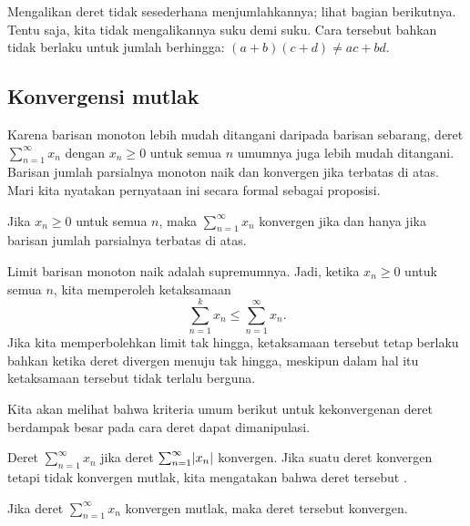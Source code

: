 Mengalikan deret tidak sesederhana menjumlahkannya; lihat bagian
berikutnya.
Tentu saja, kita tidak mengalikannya
suku demi suku.  Cara tersebut bahkan tidak berlaku untuk jumlah berhingga:
$(a+b)(c+d) \neq ac+bd$.

\subsection{Konvergensi mutlak}

Karena barisan monoton lebih mudah ditangani daripada barisan sebarang,
deret $\sum_{n=1}^\infty x_n$ dengan $x_n \geq 0$ untuk semua $n$
umumnya juga lebih mudah ditangani.  Barisan jumlah parsialnya monoton naik
dan konvergen jika terbatas di atas.
Mari kita nyatakan pernyataan ini secara formal sebagai proposisi.

\begin{prop}
Jika $x_n \geq 0$ untuk semua $n$, maka $\sum_{n=1}^\infty x_n$ konvergen jika dan hanya jika
barisan jumlah parsialnya terbatas di atas.
\end{prop}

Limit barisan monoton naik adalah supremumnya.
Jadi, ketika $x_n \geq 0$ untuk semua $n$, kita memperoleh
ketaksamaan
\begin{equation*}
\sum_{n=1}^k x_n \leq
\sum_{n=1}^\infty x_n .
\end{equation*}
Jika kita memperbolehkan limit tak hingga, ketaksamaan tersebut tetap
berlaku bahkan ketika deret divergen menuju tak hingga, meskipun dalam hal itu
ketaksamaan tersebut tidak terlalu berguna.

Kita akan melihat bahwa kriteria umum berikut untuk kekonvergenan deret 
berdampak besar pada cara deret dapat dimanipulasi.

\begin{defn}
Deret $\sum_{n=1}^\infty x_n$
\emph{} jika
deret $\sum_{n=1}^\infty \lvert {x_n} \rvert$ konvergen.
Jika suatu deret konvergen tetapi tidak konvergen mutlak, kita mengatakan bahwa
deret tersebut \emph{}.
\end{defn}

\begin{prop}
Jika deret $\sum_{n=1}^\infty x_n$ konvergen mutlak, maka deret tersebut konvergen.
\end{prop}

